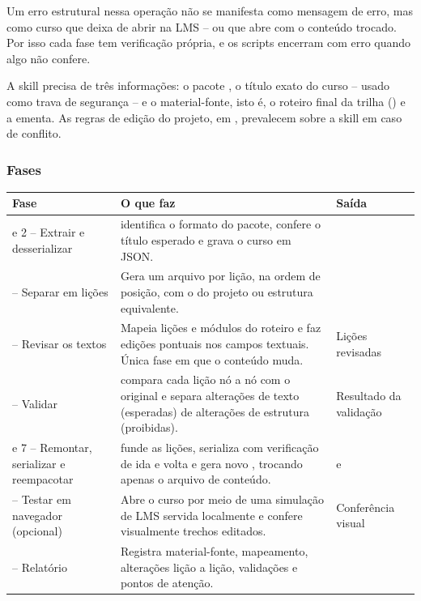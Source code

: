 \documentclass[12pt,a4paper]{article}
\begin{document}
Um erro estrutural nessa operação não se manifesta como mensagem de erro, mas como curso que deixa de abrir na LMS -- ou que abre com o conteúdo trocado. Por isso cada fase tem verificação própria, e os scripts encerram com erro quando algo não confere.

A skill precisa de três informações: o pacote , o título exato do curso -- usado como trava de segurança -- e o material-fonte, isto é, o roteiro final da trilha () e a ementa. As regras de edição do projeto, em , prevalecem sobre a skill em caso de conflito.

\subsubsection*{Fases}

\begingroup\small
\renewcommand{\arraystretch}{1.3}
\begin{longtable}{@{}L{0.22\textwidth}L{0.44\textwidth}L{0.28\textwidth}@{}}
\toprule
\textbf{Fase} & \textbf{O que faz} & \textbf{Saída} \\
\midrule
\endhead
\bottomrule
{} e 2 -- Extrair e desserializar &  identifica o formato do pacote, confere o título esperado e grava o curso em JSON. &  \\
 -- Separar em lições & Gera um arquivo por lição, na ordem de posição, com o  do projeto ou estrutura equivalente. &  \\
 -- Revisar os textos & Mapeia lições e módulos do roteiro e faz edições pontuais nos campos textuais. Única fase em que o conteúdo muda. & Lições revisadas \\
 -- Validar &  compara cada lição nó a nó com o original e separa alterações de texto (esperadas) de alterações de estrutura (proibidas). & Resultado da validação \\
 e 7 -- Remontar, serializar e reempacotar &  funde as lições, serializa com verificação de ida e volta e gera novo , trocando apenas o arquivo de conteúdo. &  e  \\
 -- Testar em navegador (opcional) & Abre o curso por meio de uma simulação de LMS servida localmente e confere visualmente trechos editados. & Conferência visual \\
 -- Relatório & Registra material-fonte, mapeamento, alterações lição a lição, validações e pontos de atenção. &  \\
\end{longtable}
\endgroup
\end{document}
